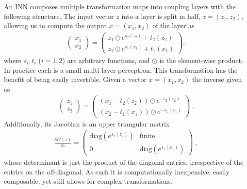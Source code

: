 An INN composes multiple transformation maps into coupling layers with
the following structure. The input vector $z$ into a layer is split in
half, $z = (z_1,z_2)$, allowing us to compute the output $x=(x_1,x_2)$
of the layer as
%
\begin{align}
\begin{pmatrix} x_1 \\ x_2 \end{pmatrix} =
\begin{pmatrix}
z_1 \odot e^{s_2(z_2)} + t_2(z_2) \\
z_2 \odot e^{s_1(x_1)} + t_1(x_1)
\end{pmatrix}\label{eq:layer1},
\end{align}
%
where $s_i, t_i$ ($i=1,2$) are arbitrary functions, and $\odot$ is the
element-wise product. In practice each is a small multi-layer
perceptron. This transformation has the benefit of being easily
invertible. Given a vector $x=(x_1,x_2)$ the inverse given as
%
\begin{align}
\begin{pmatrix} z_1 \\ z_2 \end{pmatrix} =
\begin{pmatrix}
(x_1 - t_2(z_2)) \odot e^{-s_2(z_2)} \\
(x_2 - t_1(x_1)) \odot e^{-s_1(x_1)}
\end{pmatrix} \; .
\label{eq:layer2}
\end{align}
%
Additionally, its Jacobian is an upper triangular matrix
%
\begin{align}
\frac{\partial G(z)}{\partial z} =
\begin{pmatrix}
\text{diag}\left(e^{s_2(z_2)}\right) & \text{finite} \\
0 & \text{diag}\left(e^{s_1(x_1)}\right)
\end{pmatrix}  \; ,
\end{align}
%
whose determinant is just the product of the diagonal entries,
irrespective of the entries on the off-diagonal. As such it is
computationally inexpensive, easily composable, yet still allows for
complex transformations.

